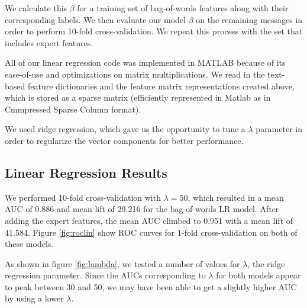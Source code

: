 \documentclass[preprint]{acm_proc_article-sp}
\begin{document}
We calculate this $\beta$ for a training set of bag-of-words features along with their corresponding labels. 
We then evaluate our model $\beta$ on the remaining messages in order to perform 10-fold cross-validation. 
We repeat this process with the set that includes expert features.

All of our linear regression code was implemented in MATLAB because of its ease-of-use 
and optimizations on matrix multiplications. We read in the text-based feature dictionaries and the feature matrix
representations created above, which is stored as a sparse matrix (efficiently represented in Matlab as 
in Cmmpressed Sparse Column format).

We used ridge regression, which gave us the opportunity to tune a $\lambda$ parameter in order to 
regularize the vector components for better performance. 

\subsection{Linear Regression Results}

We performed 10-fold cross-validation with $\lambda=50$, which resulted in a mean AUC of 0.886 and mean lift of 
29.216 for the bag-of-words LR model. After adding the expert features, the mean AUC climbed to 0.951 with a mean 
lift of 41.584. Figure \ref{fig:roclin} show ROC curves for 1-fold cross-validation on both of these models.

As shown in figure \ref{fig:lambda}, we tested a number of values for $\lambda$, the ridge regression parameter. 
Since the AUCs corresponding to $\lambda$ for both models appear to peak between 30 and 50, we may have been able to 
get a slightly higher AUC by using a lower $\lambda$.
\end{document}
